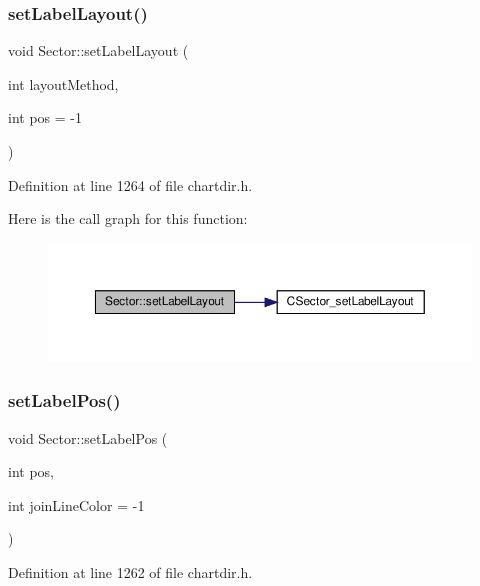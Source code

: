 \subsubsection{\texorpdfstring{set\+Label\+Layout()}{setLabelLayout()}}
{\footnotesize\ttfamily void Sector\+::set\+Label\+Layout (\begin{DoxyParamCaption}\item[{int}]{layout\+Method,  }\item[{int}]{pos = {\ttfamily -\/1} }\end{DoxyParamCaption})\hspace{0.3cm}{\ttfamily [inline]}}



Definition at line 1264 of file chartdir.\+h.

Here is the call graph for this function\+:
\nopagebreak
\begin{figure}[H]
\begin{center}
\leavevmode
\includegraphics[width=350pt]{class_sector_a9a658aff9d425de147c28351747468ab_cgraph}
\end{center}
\end{figure}
\mbox{\label{class_sector_ac09478340cba279b7cbaff69b5fc828f}} 
\subsubsection{\texorpdfstring{set\+Label\+Pos()}{setLabelPos()}}
{\footnotesize\ttfamily void Sector\+::set\+Label\+Pos (\begin{DoxyParamCaption}\item[{int}]{pos,  }\item[{int}]{join\+Line\+Color = {\ttfamily -\/1} }\end{DoxyParamCaption})\hspace{0.3cm}{\ttfamily [inline]}}



Definition at line 1262 of file chartdir.\+h.

